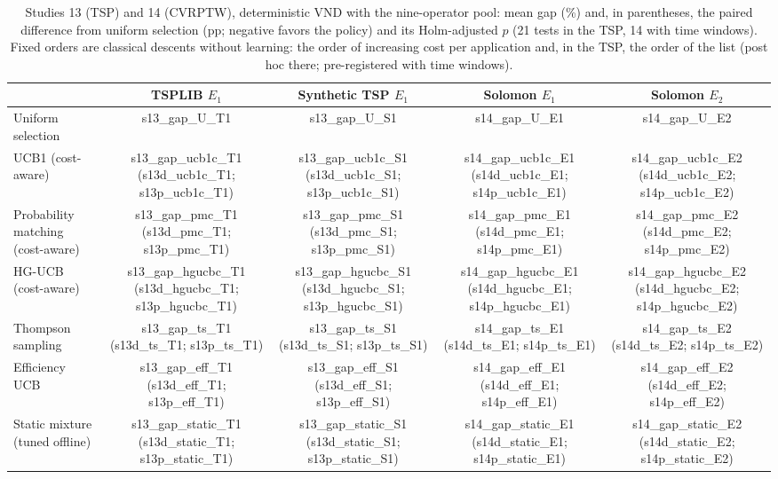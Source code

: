 \begin{table}[t]
\caption{Studies 13 (TSP) and 14 (CVRPTW), deterministic VND with the nine-operator pool: mean gap (\%) and, in parentheses, the paired difference from uniform selection (pp; negative favors the policy) and its Holm-adjusted $p$ (21 tests in the TSP, 14 with time windows). Fixed orders are classical descents without learning: the order of increasing cost per application and, in the TSP, the order of the list (post hoc there; pre-registered with time windows).}\label{tab:s1314}
\centering\small
\begin{adjustbox}{max width=\linewidth}
\begin{tabular}{lcccc}
\toprule
 & TSPLIB $E_1$ & Synthetic TSP $E_1$ & Solomon $E_1$ & Solomon $E_2$ \\
\midrule
Uniform selection & \num{s13_gap_U_T1} & \num{s13_gap_U_S1} & \num{s14_gap_U_E1} & \num{s14_gap_U_E2} \\
UCB1 (cost-aware) & \num{s13_gap_ucb1c_T1} (\num{s13d_ucb1c_T1}; \num{s13p_ucb1c_T1}) & \num{s13_gap_ucb1c_S1} (\num{s13d_ucb1c_S1}; \num{s13p_ucb1c_S1}) & \num{s14_gap_ucb1c_E1} (\num{s14d_ucb1c_E1}; \num{s14p_ucb1c_E1}) & \num{s14_gap_ucb1c_E2} (\num{s14d_ucb1c_E2}; \num{s14p_ucb1c_E2}) \\
Probability matching (cost-aware) & \num{s13_gap_pmc_T1} (\num{s13d_pmc_T1}; \num{s13p_pmc_T1}) & \num{s13_gap_pmc_S1} (\num{s13d_pmc_S1}; \num{s13p_pmc_S1}) & \num{s14_gap_pmc_E1} (\num{s14d_pmc_E1}; \num{s14p_pmc_E1}) & \num{s14_gap_pmc_E2} (\num{s14d_pmc_E2}; \num{s14p_pmc_E2}) \\
HG-UCB (cost-aware) & \num{s13_gap_hgucbc_T1} (\num{s13d_hgucbc_T1}; \num{s13p_hgucbc_T1}) & \num{s13_gap_hgucbc_S1} (\num{s13d_hgucbc_S1}; \num{s13p_hgucbc_S1}) & \num{s14_gap_hgucbc_E1} (\num{s14d_hgucbc_E1}; \num{s14p_hgucbc_E1}) & \num{s14_gap_hgucbc_E2} (\num{s14d_hgucbc_E2}; \num{s14p_hgucbc_E2}) \\
Thompson sampling & \num{s13_gap_ts_T1} (\num{s13d_ts_T1}; \num{s13p_ts_T1}) & \num{s13_gap_ts_S1} (\num{s13d_ts_S1}; \num{s13p_ts_S1}) & \num{s14_gap_ts_E1} (\num{s14d_ts_E1}; \num{s14p_ts_E1}) & \num{s14_gap_ts_E2} (\num{s14d_ts_E2}; \num{s14p_ts_E2}) \\
Efficiency UCB & \num{s13_gap_eff_T1} (\num{s13d_eff_T1}; \num{s13p_eff_T1}) & \num{s13_gap_eff_S1} (\num{s13d_eff_S1}; \num{s13p_eff_S1}) & \num{s14_gap_eff_E1} (\num{s14d_eff_E1}; \num{s14p_eff_E1}) & \num{s14_gap_eff_E2} (\num{s14d_eff_E2}; \num{s14p_eff_E2}) \\
Static mixture (tuned offline) & \num{s13_gap_static_T1} (\num{s13d_static_T1}; \num{s13p_static_T1}) & \num{s13_gap_static_S1} (\num{s13d_static_S1}; \num{s13p_static_S1}) & \num{s14_gap_static_E1} (\num{s14d_static_E1}; \num{s14p_static_E1}) & \num{s14_gap_static_E2} (\num{s14d_static_E2}; \num{s14p_static_E2}) \\

\end{tabular}
\end{adjustbox}
\end{table}
